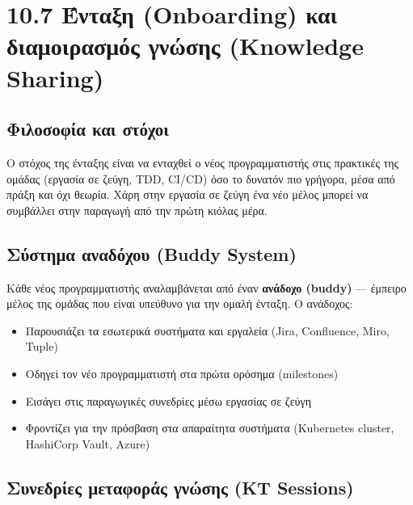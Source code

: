 \documentclass[11pt,a4paper,greek,twoside]{template-xe}
\providecommand{\tightlist}{\setlength{\itemsep}{0pt}\setlength{\parskip}{0pt}}
\begin{document}
\section{10.7 Ένταξη (Onboarding) και διαμοιρασμός γνώσης (Knowledge
Sharing)}\label{ux3adux3bdux3c4ux3b1ux3beux3b7-onboarding-ux3baux3b1ux3b9-ux3b4ux3b9ux3b1ux3bcux3bfux3b9ux3c1ux3b1ux3c3ux3bcux3ccux3c2-ux3b3ux3bdux3ceux3c3ux3b7ux3c2-knowledge-sharing}

\subsection{Φιλοσοφία και
στόχοι}\label{ux3c6ux3b9ux3bbux3bfux3c3ux3bfux3c6ux3afux3b1-ux3baux3b1ux3b9-ux3c3ux3c4ux3ccux3c7ux3bfux3b9}

Ο στόχος της ένταξης είναι να ενταχθεί ο νέος προγραμματιστής στις
πρακτικές της ομάδας (εργασία σε ζεύγη, TDD, CI/CD) όσο το δυνατόν πιο
γρήγορα, μέσα από πράξη και όχι θεωρία. Χάρη στην εργασία σε ζεύγη ένα
νέο μέλος μπορεί να συμβάλλει στην παραγωγή από την πρώτη κιόλας μέρα.

\subsection{Σύστημα αναδόχου (Buddy
System)}\label{ux3c3ux3cdux3c3ux3c4ux3b7ux3bcux3b1-ux3b1ux3bdux3b1ux3b4ux3ccux3c7ux3bfux3c5-buddy-system}

Κάθε νέος προγραμματιστής αναλαμβάνεται από έναν \textbf{ανάδοχο
(buddy)} --- έμπειρο μέλος της ομάδας που είναι υπεύθυνο για την ομαλή
ένταξη. Ο ανάδοχος:

\begin{itemize}
\tightlist
\item
  Παρουσιάζει τα εσωτερικά συστήματα και εργαλεία (Jira, Confluence,
  Miro, Tuple)
\item
  Οδηγεί τον νέο προγραμματιστή στα πρώτα ορόσημα (milestones)
\item
  Εισάγει στις παραγωγικές συνεδρίες μέσω εργασίας σε ζεύγη
\item
  Φροντίζει για την πρόσβαση στα απαραίτητα συστήματα (Kubernetes
  cluster, HashiCorp Vault, Azure)
\end{itemize}

\subsection{Συνεδρίες μεταφοράς γνώσης (KT
Sessions)}\label{ux3c3ux3c5ux3bdux3b5ux3b4ux3c1ux3afux3b5ux3c2-ux3bcux3b5ux3c4ux3b1ux3c6ux3bfux3c1ux3acux3c2-ux3b3ux3bdux3ceux3c3ux3b7ux3c2-kt-sessions}
\end{document}
